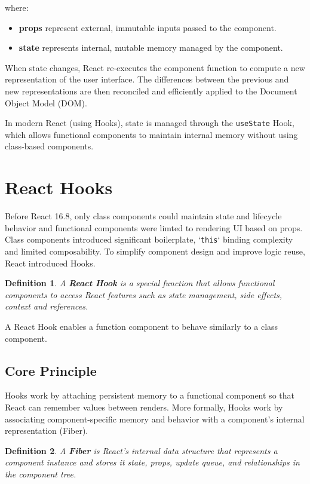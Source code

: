 \documentclass[12pt, a4paper]{report}
\newtheorem{definition}{Definition}
\begin{document}
     where:
     \begin{itemize}
         \item \textbf{props} represent external, immutable inputs passed to the component.
         \item \textbf{state} represents internal, mutable memory managed by the component.
     \end{itemize}

     When state changes, React re-executes the component function to compute a new representation of the user interface. The differences between the previous and new representations are then reconciled and efficiently applied to the Document Object Model (DOM).

     In modern React (using Hooks), state is managed through the \texttt{useState} Hook, which allows functional components to maintain internal memory without using class-based components.

     \section{React Hooks}
     Before React 16.8, only class components could maintain state and lifecycle behavior and functional components were limted to rendering UI based on props. Class components introduced significant boilerplate, `\texttt{this}` binding complexity and limited composability. To simplify component design and improve logic reuse, React introduced Hooks.

     \begin{definition}
        A \textbf{React Hook} is a special function that allows functional components to access React features such as state management, side effects, context and references.
     \end{definition}
     A React Hook enables a function component to behave similarly to a class component.

     \subsection{Core Principle}
     Hooks work by attaching persistent memory to a functional component so that React can remember values between renders. More formally, Hooks work by associating component-specific memory and behavior with a component’s internal representation (Fiber).

     \begin{definition}
        A \textbf{Fiber} is React's internal data structure that represents a component instance and stores it state, props, update queue, and relationships in the component tree.
     \end{definition}
\end{document}
